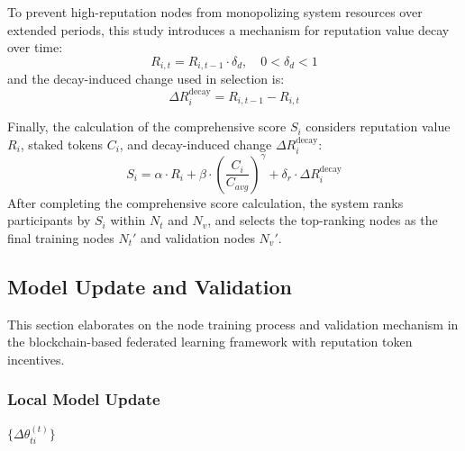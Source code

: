 \documentclass[a4paper]{cas-dc}
\begin{document}
To prevent high-reputation nodes from monopolizing system resources over extended periods, this study introduces a mechanism for reputation value decay over time:
\begin{equation}
	R_{i,t} = R_{i,t-1} \cdot \delta_d,\quad 0 < \delta_d < 1
\end{equation}
and the decay-induced change used in selection is:
\begin{equation}
	\Delta R_i^{\mathrm{decay}} = R_{i,t-1} - R_{i,t}
\end{equation}

Finally, the calculation of the comprehensive score $S_i$ considers reputation value $R_i$, staked tokens $C_i$, and decay-induced change $\Delta R_i^{\mathrm{decay}}$:
\begin{equation}
	S_i = \alpha \cdot R_i + \beta \cdot \left( \frac{C_i}{C_{avg}} \right)^{\gamma} + \delta_r \cdot \Delta R_i^{\mathrm{decay}}
\end{equation}
After completing the comprehensive score calculation, the system ranks participants by $S_i$ within $N_t$ and $N_v$, and selects the top-ranking nodes as the final training nodes $N_t'$ and validation nodes $N_v'$.

\subsection{Model Update and Validation}
This section elaborates on the node training process and validation mechanism in the blockchain-based federated learning framework with reputation token incentives.

\subsubsection{Local Model Update}
\begin{algorithm}
	\caption{Local Model Update (in global round $t$)}
	\label{sf2}
	
	\Return $\{\Delta \theta_{ti}^{(t)}\}$\;
\end{algorithm}
\end{document}
